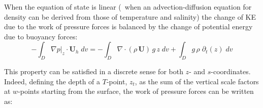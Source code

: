 \documentclass[../main/NEMO_manual]{subfiles}
\begin{document}

When the equation of state is linear
(\ie\ when an advection-diffusion equation for density can be derived from those of temperature and salinity)
the change of KE due to the work of pressure forces is balanced by
the change of potential energy due to buoyancy forces:
\[
  - \int_D  \left. \nabla p \right|_z \cdot \textbf{U}_h \;dv
  = - \int_D \nabla \cdot \left( \rho \,\textbf {U} \right) \,g\,z \;dv
  + \int_D g\, \rho \; \partial_t (z)  \;dv
\]

This property can be satisfied in a discrete sense for both $z$- and $s$-coordinates.
Indeed, defining the depth of a $T$-point, $z_t$,
as the sum of the vertical scale factors at $w$-points starting from the surface,
the work of pressure forces can be written as:
\end{document}
